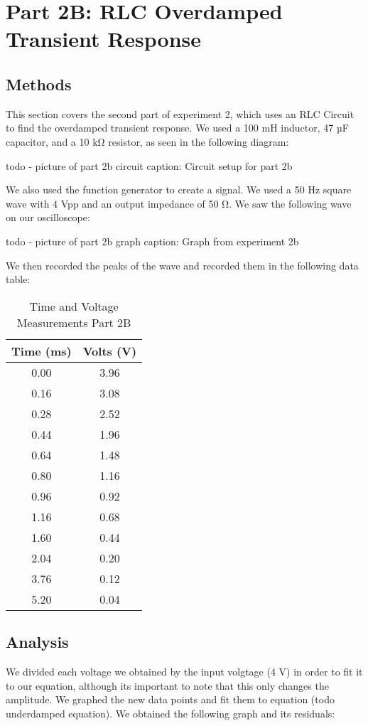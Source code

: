 \documentclass[11pt]{article}
\let\oldsection\section
\renewcommand\section{\clearpage\oldsection}
\begin{document}
    \section{Part 2B: RLC Overdamped Transient Response}\label{sec:part2b_overdamped}
    \subsection{Methods}\label{subsec:part2b_methods}
    This section covers the second part of experiment 2, which uses an RLC Circuit to find the overdamped transient response. We used a 100 mH inductor, 47 µF capacitor, and a 10 kΩ resistor, as seen in the following diagram:

    todo - picture of part 2b circuit
    caption: Circuit setup for part 2b

    We also used the function generator to create a signal. We used a 50 Hz square wave with 4 Vpp and an output impedance of 50 Ω. We saw the following wave on our oscilloscope:

    todo - picture of part 2b graph
    caption: Graph from experiment 2b

    We then recorded the peaks of the wave and recorded them in the following data table:

    \begin{table}[h]
    \centering
    \caption{Time and Voltage Measurements Part 2B}
    \begin{tabular}{cc}
    \toprule
    \textbf{Time (ms)} & \textbf{Volts (V)} \\
    \midrule
    0.00 & 3.96 \\
    0.16 & 3.08 \\
    0.28 & 2.52 \\
    0.44 & 1.96 \\
    0.64 & 1.48 \\
    0.80 & 1.16 \\
    0.96 & 0.92 \\
    1.16 & 0.68 \\
    1.60 & 0.44 \\
    2.04 & 0.20 \\
    3.76 & 0.12 \\
    5.20 & 0.04 \\
    \bottomrule
    \end{tabular}
    \end{table}

    
    \subsection{Analysis}\label{subsec:part2b_analysis}
    We divided each voltage we obtained by the input volgtage (4 V) in
    order to fit it to our equation, although its important to note that
    this only changes the amplitude. We graphed the new data points and fit
    them to equation (todo underdamped equation). We obtained the following
    graph and its residuals:
\end{document}
